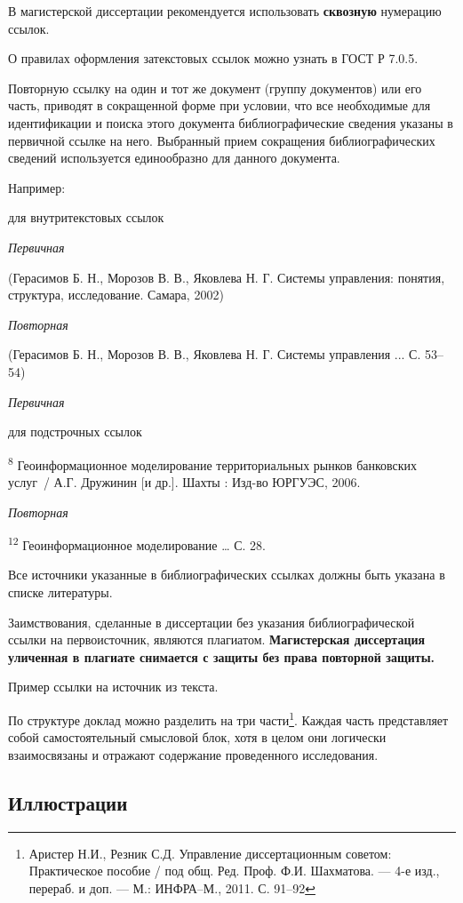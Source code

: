 \documentclass[12pt,a4paper, oneside]{extreport}
\begin{document}
В магистерской диссертации рекомендуется использовать \textbf{сквозную} нумерацию ссылок.

О правилах оформления затекстовых ссылок можно узнать в ГОСТ Р 7.0.5.

Повторную ссылку на один и тот же документ (группу документов) или его часть, приводят в сокращенной форме при условии, что все необходимые для идентификации и поиска этого документа библиографические сведения указаны в первичной ссылке на него. Выбранный прием сокращения библиографических сведений используется единообразно для данного документа.

Например:

для внутритекстовых ссылок

\noindent \textit{Первичная}

(Герасимов Б. Н., Морозов В. В., Яковлева Н. Г. Системы управления: понятия, структура, исследование. Самара, 2002)

\noindent \textit{Повторная}

(Герасимов Б. Н., Морозов В. В., Яковлева Н. Г. Системы управления ... С. 53–54)

\noindent \textit{Первичная}

для подстрочных ссылок

\textsuperscript{8} Геоинформационное моделирование территориальных рынков банковских услуг~/ А.Г. Дружинин [и др.]. Шахты : Изд-во ЮРГУЭС, 2006.

\noindent \textit{Повторная}

\textsuperscript{12} Геоинформационное моделирование … С. 28.

Все источники указанные в библиографических ссылках должны быть указана в списке литературы. 

Заимствования, сделанные в диссертации без указания библиографической ссылки на первоисточник, являются плагиатом. \textbf{Магистерская диссертация уличенная в плагиате снимается с защиты без права повторной защиты.}

Пример ссылки на источник из текста.

По структуре доклад можно разделить на три части\footnote{Аристер Н.И., Резник С.Д. Управление диссертационным советом: Практическое пособие / под общ. Ред. Проф. Ф.И. Шахматова. --- 4-е изд., перераб. и доп. --- М.: ИНФРА–М., 2011. С. 91–92}. Каждая часть представляет собой самостоятельный смысловой блок, хотя в целом они логически взаимосвязаны и отражают содержание проведенного исследования.

\subsection{Иллюстрации}
\end{document}
